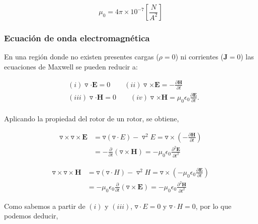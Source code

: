 \documentclass[12pt,letterpaper]{article}
\numberwithin{equation}{section}
\begin{document}
$$\mu_0 = 4\pi\times 10^{-7}\left[\frac{N}{A^2}\right]$$

\subsubsection{Ecuación de onda electromagnética}
En una región donde no existen presentes cargas ($\rho = 0$) ni corrientes ($\textbf{J} = 0$) las ecuaciones de Maxwell se pueden reducir a:

\begin{equation}
\boxed{
\begin{split}
&(i)\triangledown\cdot\textbf{E} = 0\qquad(ii)\triangledown\times\textbf{E} = -\frac{\partial\textbf{H}}{\partial t}\\
&(iii)\triangledown\cdot\textbf{H} = 0\qquad(iv)\triangledown\times\textbf{H} = \mu_0\epsilon_0\frac{\partial\textbf{E}}{\partial t}.
\end{split}
}
\label{eq: Maxwell_sin_cargas}
\end{equation}
\\

Aplicando la propiedad del rotor de un rotor, se obtiene,

\begin{equation*}
\begin{split}
\triangledown\times\triangledown\times\textbf{E} &= \triangledown(\triangledown\cdot E)-\triangledown^2E=\triangledown\times\left(-\frac{\partial \textbf{H}}{\partial t}\right)\\
&= -\frac{\partial}{\partial t}(\triangledown\times\textbf{H})=-\mu_0\epsilon_0\frac{\partial^2\textbf{E}}{\partial t^2}
\end{split}
\end{equation*}

\begin{equation*}
\begin{split}
\triangledown\times\triangledown\times\textbf{H} &= \triangledown(\triangledown\cdot H)-\triangledown^2H=\triangledown\times\left(-\mu_0\epsilon_0\frac{\partial \textbf{E}}{\partial t}\right)\\
&= -\mu_0\epsilon_0\frac{\partial}{\partial t}(\triangledown\times\textbf{E})=-\mu_0\epsilon_0\frac{\partial^2\textbf{H}}{\partial t^2}
\end{split}
\end{equation*}

Como sabemos a partir de $(i)$ y $(iii)$, $\triangledown\cdot E = 0$ y $\triangledown\cdot H = 0$, por lo que podemos deducir,
\end{document}
